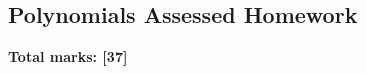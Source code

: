 \documentclass[../c1]{subfiles}
\begin{document}
\subsection*{Polynomials Assessed Homework}
\thispagestyle{fancy}



\begin{flushright}
\textbf{Total marks: [37]}
\end{flushright}
\end{document}
